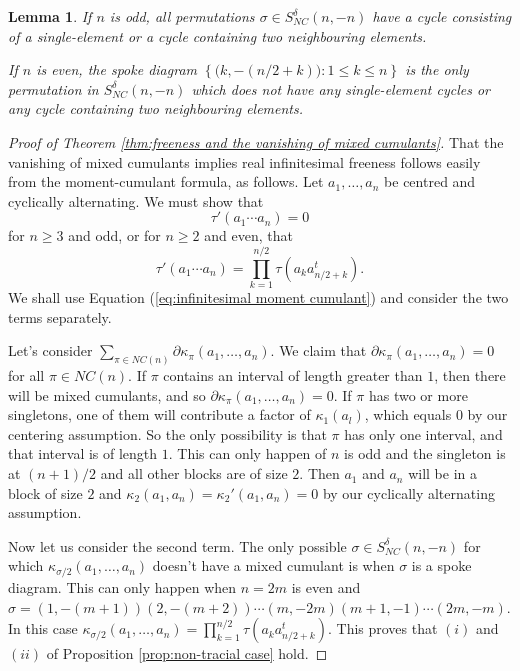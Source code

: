 \documentclass[11pt]{amsart}
\newtheorem{lemma}[theorem]{Lemma}
\theoremstyle{definition}
\numberwithin{theorem}{section}
\newcommand{\NC}{\mathit{NC}}
\newcommand{\ab}{\allowbreak}
\begin{document}
\begin{lemma}\label{lemma:emilys lemma}
If $n$ is odd, all permutations $\sigma\in
S^\delta_{NC}(n,-n)$ have a cycle consisting of a
single-element or a cycle containing two neighbouring
elements.

If $n$ is even, the spoke diagram
$\left\{\Big(k,-(n/2+k)\Big):1\leq k \leq n\right\}$ is the
only permutation in $S^\delta_{NC}(n,-n)$ which does not
have any single-element cycles or any cycle containing two
neighbouring elements.\label{lem:spoke_diagram}
\end{lemma}



\begin{proof}[Proof of Theorem \ref{thm:freeness and the vanishing of mixed cumulants}]
That the vanishing of mixed cumulants implies real
infinitesimal freeness follows easily from the
moment-cumulant formula, as follows. Let $a_1, \dots, a_n$
be centred and cyclically alternating. We must show that
\[
\tau'(a_1 \cdots\ab a_n) = 0 
\]
for $n \geq 3$ and odd, or for $n \geq 2$ and even, that 
\[
\tau'(a_1 \cdots a_n) = \prod_{k=1}^{n/2} \tau(a_k a_{n/2 + k}^t). 
\]
We shall use Equation  (\ref{eq:infinitesimal moment cumulant}) and consider the two terms separately. 

Let's consider $\sum_{\pi \in \NC(n)} \partial
\kappa_\pi(a_1, \dots, a_n)$. We claim that $\partial
\kappa_\pi(a_1, \dots, a_n)\ab = 0$ for all $\pi \in
\NC(n)$. If $\pi$ contains an interval of length greater
than $1$, then there will be mixed cumulants, and so
$\partial \kappa_\pi(a_1, \dots, a_n) = 0$. If $\pi$ has two
or more singletons, one of them will contribute a factor of
$\kappa_1(a_l)$, which equals $0$ by our centering
assumption. So the only possibility is that $\pi$ has only
one interval, and that interval is of length $1$. This can
only happen of $n$ is odd and the singleton is at $(n +
1)/2$ and all other blocks are of size $2$. Then $a_1$ and
$a_n$ will be in a block of size $2$ and $\kappa_2(a_1 ,
a_n) = \kappa_2'(a_1, a_n) = 0$ by our cyclically
alternating assumption.

Now let us consider the second term. The only possible
$\sigma \in S_\NC^\delta(n, -n)$ for which
$\kappa_{\sigma/2}(a_1, \dots, a_n)$ doesn't have a mixed
cumulant is when $\sigma$ is a spoke diagram. This can only
happen when $n = 2m$ is even and $\sigma = (1, -(m+1))(2,
-(m+2)) \cdots (m, -2m) \ab (m+1, -1) \cdots (2m , -m)$. In
this case $\kappa_{\sigma/2}(a_1, \dots, a_n) =
\prod_{k=1}^{n/2} \tau(a_k a_{n/2 + k}^t)$. This proves that
$(i)$ and $(ii)$ of Proposition \ref{prop:non-tracial case}
hold.



\end{proof}
\end{document}
